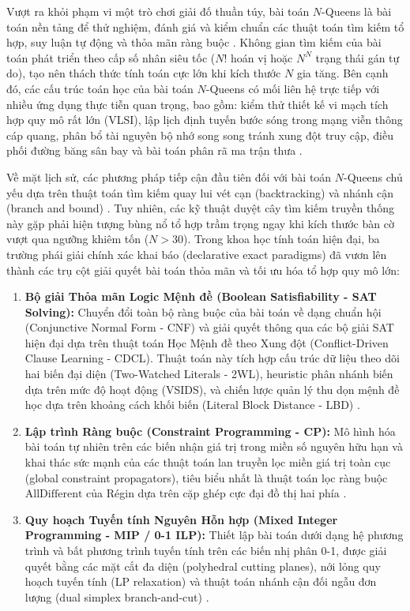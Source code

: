 \documentclass[a4paper,fleqn]{cas-sc}
\begin{document}
Vượt ra khỏi phạm vi một trò chơi giải đố thuần túy, bài toán $N$-Queens là bài toán nền tảng để thử nghiệm, đánh giá và kiểm chuẩn các thuật toán tìm kiếm tổ hợp, suy luận tự động và thỏa mãn ràng buộc \cite{bell2009survey,sosic1994polynomial}. Không gian tìm kiếm của bài toán phát triển theo cấp số nhân siêu tốc ($N!$ hoán vị hoặc $N^N$ trạng thái gán tự do), tạo nên thách thức tính toán cực lớn khi kích thước $N$ gia tăng. Bên cạnh đó, các cấu trúc toán học của bài toán $N$-Queens có mối liên hệ trực tiếp với nhiều ứng dụng thực tiễn quan trọng, bao gồm: kiểm thử thiết kế vi mạch tích hợp quy mô rất lớn (VLSI), lập lịch định tuyến bước sóng trong mạng viễn thông cáp quang, phân bổ tài nguyên bộ nhớ song song tránh xung đột truy cập, điều phối đường băng sân bay và bài toán phân rã ma trận thưa \cite{bell2009survey,erbas1992queens}.

Về mặt lịch sử, các phương pháp tiếp cận đầu tiên đối với bài toán $N$-Queens chủ yếu dựa trên thuật toán tìm kiếm quay lui vét cạn (backtracking) và nhánh cận (branch and bound) \cite{golomb1965backtrack,bitner1975backtrack}. Tuy nhiên, các kỹ thuật duyệt cây tìm kiếm truyền thống này gặp phải hiện tượng bùng nổ tổ hợp trầm trọng ngay khi kích thước bàn cờ vượt qua ngưỡng khiêm tốn ($N > 30$). Trong khoa học tính toán hiện đại, ba trường phái giải chính xác khai báo (declarative exact paradigms) đã vươn lên thành các trụ cột giải quyết bài toán thỏa mãn và tối ưu hóa tổ hợp quy mô lớn:
\begin{enumerate}
    \item \textbf{Bộ giải Thỏa mãn Logic Mệnh đề (Boolean Satisfiability - SAT Solving):} Chuyển đổi toàn bộ ràng buộc của bài toán về dạng chuẩn hội (Conjunctive Normal Form - CNF) và giải quyết thông qua các bộ giải SAT hiện đại dựa trên thuật toán Học Mệnh đề theo Xung đột (Conflict-Driven Clause Learning - CDCL). Thuật toán này tích hợp cấu trúc dữ liệu theo dõi hai biến đại diện (Two-Watched Literals - 2WL), heuristic phân nhánh biến dựa trên mức độ hoạt động (VSIDS), và chiến lược quản lý thu dọn mệnh đề học dựa trên khoảng cách khối biến (Literal Block Distance - LBD) \cite{biere2009handbook,audemard2009predicting,moskewicz2001chaff}.
    \item \textbf{Lập trình Ràng buộc (Constraint Programming - CP):} Mô hình hóa bài toán tự nhiên trên các biến nhận giá trị trong miền số nguyên hữu hạn và khai thác sức mạnh của các thuật toán lan truyền lọc miền giá trị toàn cục (global constraint propagators), tiêu biểu nhất là thuật toán lọc ràng buộc $\text{AllDifferent}$ của Régin dựa trên cặp ghép cực đại đồ thị hai phía \cite{regin1994filtering,rossi2006handbook}.
    \item \textbf{Quy hoạch Tuyến tính Nguyên Hỗn hợp (Mixed Integer Programming - MIP / 0-1 ILP):} Thiết lập bài toán dưới dạng hệ phương trình và bất phương trình tuyến tính trên các biến nhị phân 0-1, được giải quyết bằng các mặt cắt đa diện (polyhedral cutting planes), nới lỏng quy hoạch tuyến tính (LP relaxation) và thuật toán nhánh cận đối ngẫu đơn lượng (dual simplex branch-and-cut) \cite{wolsey1999integer,nemhauser1988integer}.
\end{enumerate}
\end{document}
